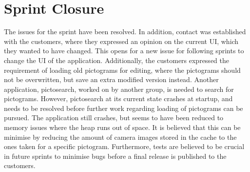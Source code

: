\section{Sprint Closure}
The issues for the sprint have been resolved.
In addition, contact was established with the customers, where they expressed an opinion on the current UI, which they wanted to have changed.
This opens for a new issue for following sprints to change the UI of the application.
Additionally, the customers expressed the requirement of loading old pictograms for editing, where the pictograms should not be overwritten, but save an extra modified version instead.
Another application, pictosearch, worked on by another group, is needed to search for pictograms.
However, pictosearch at its current state crashes at startup, and needs to be resolved before further work regarding loading of pictograms can be pursued.
The application still crashes, but seems to have been reduced to memory issues where the heap runs out of space.
It is believed that this can be minimise by reducing the amount of camera images stored in the cache to the ones taken for a specific pictogram.
Furthermore, tests are believed to be crucial in future sprints to minimise bugs before a final release is published to the customers.
